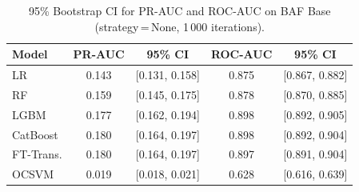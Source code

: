 \begin{table}[ht!]
\centering
\caption{95\% Bootstrap CI for PR-AUC and ROC-AUC on BAF Base (strategy\,=\,None, 1\,000 iterations).}
\label{tab:ci_baf}
\begin{tabular}{l c c c c}
\toprule
Model & PR-AUC & 95\% CI & ROC-AUC & 95\% CI \\
\midrule
LR         & 0.143 & [0.131, 0.158] & 0.875 & [0.867, 0.882] \\
RF         & 0.159 & [0.145, 0.175] & 0.878 & [0.870, 0.885] \\
LGBM       & 0.177 & [0.162, 0.194] & 0.898 & [0.892, 0.905] \\
CatBoost   & 0.180 & [0.164, 0.197] & 0.898 & [0.892, 0.904] \\
FT-Trans.  & 0.180 & [0.164, 0.197] & 0.897 & [0.891, 0.904] \\
OCSVM      & 0.019 & [0.018, 0.021] & 0.628 & [0.616, 0.639] \\
\bottomrule
\end{tabular}
\end{table}